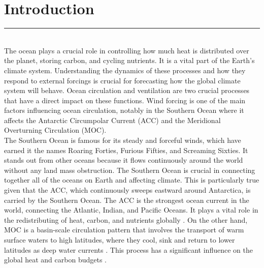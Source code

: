 \documentclass[12pt]{article}
\begin{document}
\section{Introduction}
\rule{\textwidth}{0.4pt}\\
The ocean plays a crucial role in controlling how much heat is distributed over the planet, storing carbon, and cycling nutrients. It is a vital part of the Earth's climate system. Understanding the dynamics of these processes and how they respond to external forcings is crucial for forecasting how the global climate system will behave. Ocean circulation and ventilation are two crucial processes that have a direct impact on these functions. Wind forcing is one of the main factors influencing ocean circulation, notably in the Southern Ocean where it affects the Antarctic Circumpolar Current (ACC) and the Meridional Overturning Circulation (MOC).\\ 

\noindent The Southern Ocean is famous for its steady and forceful winds, which have earned it the names Roaring Forties, Furious Fifties, and Screaming Sixties. It stands out from other oceans because it flows continuously around the world without any land mass obstruction. The Southern Ocean is crucial in connecting together all of the oceans on Earth and affecting climate. This is particularly true given that the ACC, which continuously sweeps eastward around Antarctica, is carried by the Southern Ocean.  The ACC is the strongest ocean current in the world, connecting the Atlantic, Indian, and Pacific Oceans. It plays a vital role in the redistributing of heat, carbon, and nutrients globally \citep{rintoul2001antarctic}. On the other hand, MOC is a basin-scale circulation pattern that involves the transport of warm surface waters to high latitudes, where they cool, sink and return to lower latitudes as deep water currents \citep{talley2013closure}. This process has a significant influence on the global heat and carbon budgets \citep{rahmstorf2006thermohaline}.\\
\end{document}

